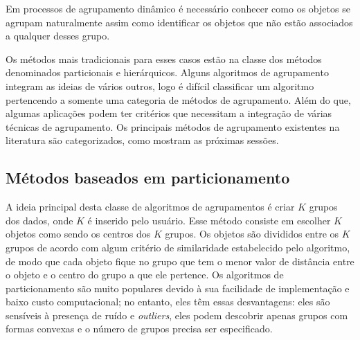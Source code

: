 Em processos de agrupamento dinâmico é necessário conhecer como os objetos se agrupam naturalmente assim como identificar os objetos que não estão associados a qualquer desses grupo.

Os métodos mais tradicionais para esses casos estão na classe dos métodos denominados particionais e hierárquicos. Alguns algoritmos de agrupamento integram as ideias de vários outros, logo é difícil classificar um algoritmo pertencendo a somente uma categoria de métodos de agrupamento. Além do que, algumas aplicações podem ter critérios que necessitam a integração de várias técnicas de agrupamento. Os principais métodos de agrupamento existentes na literatura são categorizados, como mostram as próximas sessões.

\subsection{Métodos baseados em particionamento}
A ideia principal desta classe de algoritmos de agrupamentos é criar ${K}$ grupos dos dados, onde ${K}$ é inserido pelo usuário.
Esse método consiste em escolher ${K}$ objetos como sendo os centros dos ${K}$ grupos.
Os objetos são divididos entre os ${K}$ grupos de acordo com algum critério de similaridade
estabelecido pelo algoritmo, de modo que cada objeto fique no grupo que tem o menor valor de
distância entre o objeto e o centro do grupo a que ele pertence.
Os algoritmos de particionamento são muito populares devido à sua facilidade de implementação e baixo custo computacional; no entanto, eles têm essas desvantagens: eles são sensíveis à presença de ruído e \textit{outliers}, eles podem descobrir apenas grupos com formas convexas e o número de grupos precisa ser especificado.


